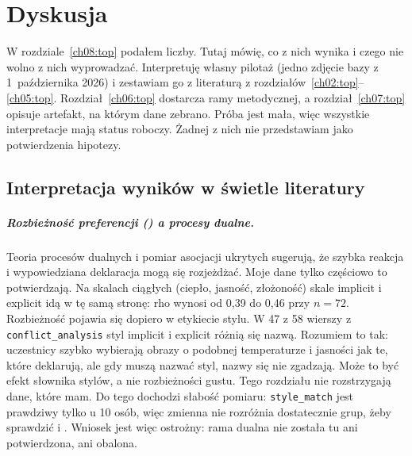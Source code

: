 \chapter{Dyskusja}
\label{ch09:top}

W rozdziale~\ref{ch08:top} podałem liczby. Tutaj mówię, co z nich wynika i czego nie wolno z nich wyprowadzać. Interpretuję własny pilotaż (jedno zdjęcie bazy z 1~października 2026) i zestawiam go z literaturą z rozdziałów~\ref{ch02:top}--\ref{ch05:top}. Rozdział~\ref{ch06:top} dostarcza ramy metodycznej, a rozdział~\ref{ch07:top} opisuje artefakt, na którym dane zebrano.
Próba jest mała, więc wszystkie interpretacje mają status roboczy. Żadnej z nich nie przedstawiam jako potwierdzenia hipotezy.

\section{Interpretacja wyników w świetle literatury}
\label{ch09:sec:interpretacja}

\paragraph{Rozbieżność preferencji () a procesy dualne.}
Teoria procesów dualnych \parencite{kahneman2011thinking} i pomiar asocjacji ukrytych \parencite{greenwald1998iat} sugerują, że szybka reakcja i wypowiedziana deklaracja mogą się rozjeżdżać. Moje dane tylko częściowo to potwierdzają.
Na skalach ciągłych (ciepło, jasność, złożoność) skale implicit i explicit idą w tę samą stronę: rho wynosi od 0,39 do 0,46 przy $n=72$. Rozbieżność pojawia się dopiero w etykiecie stylu. W 47 z 58 wierszy z \texttt{conflict\_analysis} styl implicit i explicit różnią się nazwą. Rozumiem to tak: uczestnicy szybko wybierają obrazy o podobnej temperaturze i jasności jak te, które deklarują, ale gdy muszą nazwać styl, nazwy się nie zgadzają. Może to być efekt słownika stylów, a nie rozbieżności gustu. Tego rozdziału nie rozstrzygają dane, które mam.
Do tego dochodzi słabość pomiaru: \texttt{style\_match} jest prawdziwy tylko u 10 osób, więc zmienna nie rozróżnia dostatecznie grup, żeby sprawdzić  i . Wniosek jest więc ostrożny: rama dualna nie została tu ani potwierdzona, ani obalona.

